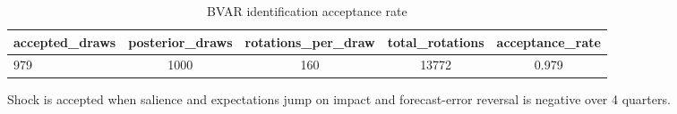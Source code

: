 \begin{table}[!htbp]
\centering
\caption{BVAR identification acceptance rate}
\label{tab:bvar_acceptance}
\begin{threeparttable}
\begin{tabular}{lcccc}
\toprule
accepted\_draws & posterior\_draws & rotations\_per\_draw & total\_rotations & acceptance\_rate \\
\midrule
979 & 1000 & 160 & 13772 & 0.979 \\
\bottomrule
\end{tabular}
\begin{tablenotes}[flushleft]
\footnotesize
\item Shock is accepted when salience and expectations jump on impact and forecast-error reversal is negative over 4 quarters.
\end{tablenotes}
\end{threeparttable}
\end{table}
